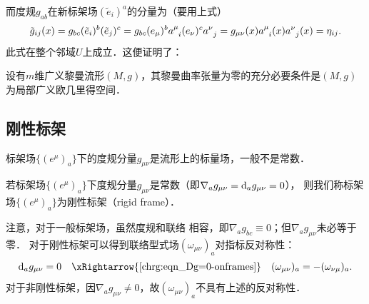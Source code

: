 而度规$g_{ab}$在新标架场$(\tilde{e}_i)^a$的分量为（要用上式）
\begin{equation}
    \tilde{g}_{ij}(x)=g_{bc} (\tilde{e}_i)^b(\tilde{e}_j)^c
    = g_{bc} (e_\mu)^{b} a_{\hphantom{\mu} i}^{\mu} (e_\nu)^{c} a_{\hphantom{\mu} j}^{\nu}
    = g_{\mu\nu}(x) a_{\hphantom{\mu} i}^{\mu}(x)  a_{\hphantom{\mu} j}^{\nu}(x) = \eta_{ij}.
\end{equation}
此式在整个邻域$U$上成立．这便证明了：
\begin{theorem}\label{chrg:thm_local-EuclideanSpace}
    设有$m$维广义黎曼流形$(M,g)$，其黎曼曲率张量为零的充分必要条件是$(M,g)$为局部广义欧几里得空间．
\end{theorem}




\subsection{刚性标架}\label{chrg:sec_rigid-frame}
标架场$\{(e^\mu)_{a}\}$下的度规分量$g_{\mu\nu}$是流形上的标量场，一般不是常数．
\begin{definition}\label{chrg:def_rigid-frame}
    若标架场$\{(e^\mu)_{a}\}$下度规分量$g_{\mu\nu}$是常数（即$\nabla_a g_{\mu\nu}={\rm d}_a g_{\mu\nu}=0$），
    则我们称标架场$\{(e^\mu)_{a}\}$为{\heiti 刚性标架}（rigid frame）．
\end{definition}
注意，对于一般标架场，虽然度规和联络
相容，即$\nabla_a g_{bc}\equiv0$；但$\nabla_a g_{\mu\nu}$未必等于零．
对于刚性标架可以得到联络型式场$(\omega _{\mu\nu})_{a}$对指标反对称性：
\begin{equation}\label{chrg:eqn_omega-anti}
    {\rm d}_a g_{\mu\nu}=0 \quad \xRightarrow{\ref{chrg:eqn_Dg=0-onframes}}\quad
    (\omega _{\mu\nu})_{a} = -(\omega _{\nu\mu})_{a} .
\end{equation}
对于非刚性标架，因$\nabla_a g_{\mu\nu}\neq 0$，故$(\omega _{\mu\nu})_{a}$不具有上述的反对称性．


